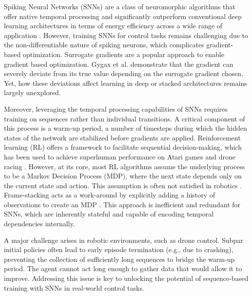 Spiking Neural Networks (SNNs) are a class of neuromorphic algorithms \cite{Maass1997} that offer native temporal processing and significantly outperform conventional deep learning architectures in terms of energy efficiency across a wide range of application \cite{yik2023neurobench}. However, training SNNs for control tasks remains challenging due to the non-differentiable nature of spiking neurons, which complicates gradient-based optimization. Surrogate gradients \cite{NeftciSurrogate} are a popular approach to enable gradient based optimization. Gygax et al. \cite{GygaxElucidating} demonstrate that the gradient can severely deviate from its true value depending on the surrogate gradient chosen. Yet, how these deviations affect learning in deep or stacked architectures remains largely unexplored.

Moreover, leveraging the temporal processing capabilities of SNNs requires training on sequences rather than individual transitions. A critical component of this process is a warm-up period, a number of timesteps during which the hidden states of the network are stabilized before gradients are applied. Reinforcement learning (RL) offers a framework to facilitate sequential decision-making, which has been used to achieve superhuman performance on Atari games \cite{mnih2013playingatarideepreinforcement} and drone racing \cite{wurman2022outracing}. However, at its core, most RL algorithms assume the underlying process to be a Markov Decision Process (MDP), where the next state depends only on the current state and action. This assumption is often not satisfied in robotics \cite{Wayne2018, WierstraRecurrentPG}. Frame-stacking acts as a work-around by explicitly adding a history of observations to create an MDP \cite{Chen2022,Liu2022,Mnih2016,Eschmann2023}. This approach is inefficient and redundant for SNNs, which are inherently stateful and capable of encoding temporal dependencies internally. 

A major challenge arises in robotic environments, such as drone control. Subpar initial policies often lead to early episode termination (e.g., due to crashing), preventing the collection of sufficiently long sequences to bridge the warm-up period. The agent cannot act long enough to gather data that would allow it to improve. Addressing this issue is key to unlocking the potential of sequence-based training with SNNs in real-world control tasks.

